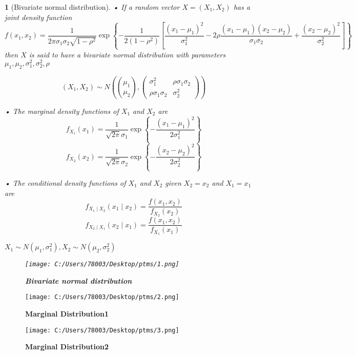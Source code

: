 \documentclass[UTF8]{report}
\theoremstyle{MyLineTheoremStyle} %
\theoremstyle{MyBlockTheoremStyle} %
\theoremstyle{MySubsubsectionStyle} %
\newtheorem{definition}{}
\begin{document}
\begin{definition}[Bivariate normal distribution]
    • If a random vector \(X = (X_1, X_2)\) has a joint density function
    \[
    f(x_1, x_2) = \frac{1}{2\pi \sigma_1 \sigma_2 \sqrt{1 - \rho^2}} \exp\left\{-\frac{1}{2(1 - \rho^2)} \left[\frac{(x_1 - \mu_1)^2}{\sigma_1^2} - 2\rho \frac{(x_1 - \mu_1)(x_2 - \mu_2)}{\sigma_1 \sigma_2} + \frac{(x_2 - \mu_2)^2}{\sigma_2^2}\right]\right\}
    \]
    then \(X\) is said to have a bivariate normal distribution with parameters \(\mu_1, \mu_2, \sigma_1^2, \sigma_2^2, \rho\)\par
    \[
    (X_1, X_2) \sim N\left(\binom{\mu_1}{\mu_2}, \begin{pmatrix}
        \sigma_1^2 & \rho\sigma_1\sigma_2 \\
        \rho\sigma_1\sigma_2 & \sigma_2^2
        \end{pmatrix}\right)
    \] \par
    • The marginal density functions of \(X_1\) and \(X_2\) are
    \[
    f_{X_1}(x_1) = \frac{1}{\sqrt{2\pi} \sigma_1} \exp\left\{-\frac{(x_1 - \mu_1)^2}{2\sigma_1^2}\right\}
    \]
    \[
    f_{X_2}(x_2) = \frac{1}{\sqrt{2\pi} \sigma_2} \exp\left\{-\frac{(x_2 - \mu_2)^2}{2\sigma_2^2}\right\}
    \]\par
    • The conditional density functions of \(X_1\) and \(X_2\) given \(X_2 = x_2\) and \(X_1 = x_1\) are
    \[
    f_{X_1 \mid X_2}(x_1 \mid x_2) = \frac{f(x_1, x_2)}{f_{X_2}(x_2)}
    \]
    \[
    f_{X_2 \mid X_1}(x_2 \mid x_1) = \frac{f(x_1, x_2)}{f_{X_1}(x_1)}
    \]\par
    $X_1 \sim N(\mu_1, \sigma_1^2), X_2 \sim N(\mu_2, \sigma_2^2)$
    \begin{figure}[ht]
        \centering
        \texttt{[image: C:/Users/78003/Desktop/ptms/1.png]}
        \caption{\textbf{Bivariate normal distribution}}
        \label{fig:insert_png}
    \end{figure}
\end{definition}


\begin{figure}[ht]
        \centering
        \texttt{[image: C:/Users/78003/Desktop/ptms/2.png]}
        \caption{\textbf{Marginal Distribution1}}
        \label{fig:Marginal Distribution1}
\end{figure}

\begin{figure}[ht]
    \centering
    \texttt{[image: C:/Users/78003/Desktop/ptms/3.png]}
    \caption{\textbf{Marginal Distribution2}}
    \label{fig:Marginal Distribution2}
\end{figure}
\end{document}
